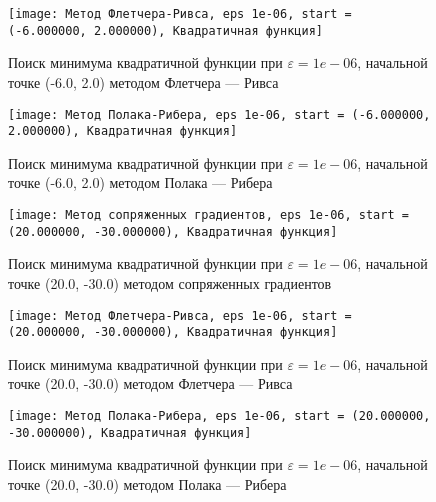             \begin{figure}[H]
	        \centering
	        \texttt{[image: Метод Флетчера-Ривса, eps 1e-06, start = (-6.000000, 2.000000), Квадратичная функция]}%
	        \caption{Поиск минимума квадратичной функции при $\varepsilon = 1e-06$, начальной точке (-6.0, 2.0) методом Флетчера --- Ривса}
	        \vspace*{-1.2cm}
            \end{figure}
            
            \begin{figure}[H]
	        \centering
	        \texttt{[image: Метод Полака-Рибера, eps 1e-06, start = (-6.000000, 2.000000), Квадратичная функция]}%
	        \caption{Поиск минимума квадратичной функции при $\varepsilon = 1e-06$, начальной точке (-6.0, 2.0) методом Полака --- Рибера}
	        \vspace*{-1.2cm}
            \end{figure}
            
            \begin{figure}[H]
	        \centering
	        \texttt{[image: Метод сопряженных градиентов, eps 1e-06, start = (20.000000, -30.000000), Квадратичная функция]}%
	        \caption{Поиск минимума квадратичной функции при $\varepsilon = 1e-06$, начальной точке (20.0, -30.0) методом сопряженных градиентов}
	        \vspace*{-1.2cm}
            \end{figure}
            
            \begin{figure}[H]
	        \centering
	        \texttt{[image: Метод Флетчера-Ривса, eps 1e-06, start = (20.000000, -30.000000), Квадратичная функция]}%
	        \caption{Поиск минимума квадратичной функции при $\varepsilon = 1e-06$, начальной точке (20.0, -30.0) методом Флетчера --- Ривса}
	        \vspace*{-1.2cm}
            \end{figure}
            
            \begin{figure}[H]
	        \centering
	        \texttt{[image: Метод Полака-Рибера, eps 1e-06, start = (20.000000, -30.000000), Квадратичная функция]}%
	        \caption{Поиск минимума квадратичной функции при $\varepsilon = 1e-06$, начальной точке (20.0, -30.0) методом Полака --- Рибера}
	        \vspace*{-1.2cm}
            \end{figure}
